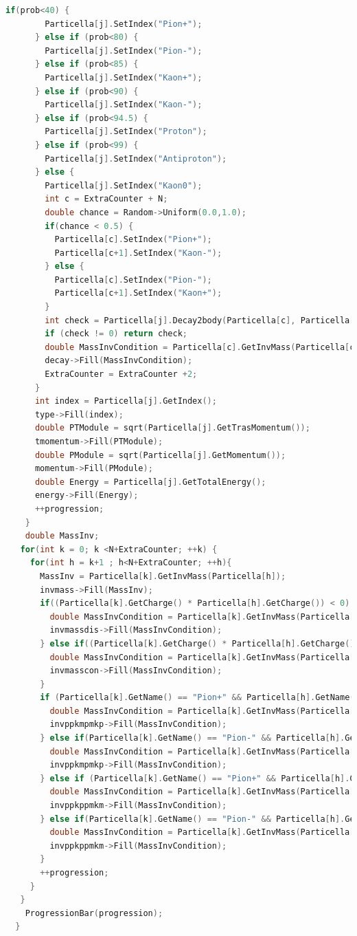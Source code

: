 \documentclass[a4paper, 11pt]{article}
\begin{document}
\begin{lstlisting}[language=c++, style=code]
      if(prob<40) {
        Particella[j].SetIndex("Pion+");
      } else if (prob<80) {
        Particella[j].SetIndex("Pion-");
      } else if (prob<85) {
        Particella[j].SetIndex("Kaon+");
      } else if (prob<90) {
        Particella[j].SetIndex("Kaon-");
      } else if (prob<94.5) {
        Particella[j].SetIndex("Proton");
      } else if (prob<99) {
        Particella[j].SetIndex("Antiproton");
      } else {
        Particella[j].SetIndex("Kaon0");
        int c = ExtraCounter + N;
        double chance = Random->Uniform(0.0,1.0);
        if(chance < 0.5) {
          Particella[c].SetIndex("Pion+");
          Particella[c+1].SetIndex("Kaon-");
        } else {
          Particella[c].SetIndex("Pion-");
          Particella[c+1].SetIndex("Kaon+");
        }
        int check = Particella[j].Decay2body(Particella[c], Particella[c+1]);
        if (check != 0) return check;
        double MassInvCondition = Particella[c].GetInvMass(Particella[c+1]);
        decay->Fill(MassInvCondition);
        ExtraCounter = ExtraCounter +2;
      }
      int index = Particella[j].GetIndex();
      type->Fill(index);
      double PTModule = sqrt(Particella[j].GetTrasMomentum());
      tmomentum->Fill(PTModule);
      double PModule = sqrt(Particella[j].GetMomentum());
      momentum->Fill(PModule);
      double Energy = Particella[j].GetTotalEnergy();
      energy->Fill(Energy);
      ++progression;
    }
    double MassInv;
   for(int k = 0; k <N+ExtraCounter; ++k) {
     for(int h = k+1 ; h<N+ExtraCounter; ++h){
       MassInv = Particella[k].GetInvMass(Particella[h]);
       invmass->Fill(MassInv);
       if((Particella[k].GetCharge() * Particella[h].GetCharge()) < 0) {
         double MassInvCondition = Particella[k].GetInvMass(Particella[h]);
         invmassdis->Fill(MassInvCondition);
       } else if((Particella[k].GetCharge() * Particella[h].GetCharge()) > 0) {
         double MassInvCondition = Particella[k].GetInvMass(Particella[h]);
         invmasscon->Fill(MassInvCondition);
       }
       if (Particella[k].GetName() == "Pion+" && Particella[h].GetName() == "Kaon-") {
         double MassInvCondition = Particella[k].GetInvMass(Particella[h]);
         invppkmpmkp->Fill(MassInvCondition);
       } else if(Particella[k].GetName() == "Pion-" && Particella[h].GetName() == "Kaon+") {
         double MassInvCondition = Particella[k].GetInvMass(Particella[h]);
         invppkmpmkp->Fill(MassInvCondition);
       } else if (Particella[k].GetName() == "Pion+" && Particella[h].GetName() == "Kaon+") {
         double MassInvCondition = Particella[k].GetInvMass(Particella[h]);
         invppkppmkm->Fill(MassInvCondition);
       } else if(Particella[k].GetName() == "Pion-" && Particella[h].GetName() == "Kaon-") {
         double MassInvCondition = Particella[k].GetInvMass(Particella[h]);
         invppkppmkm->Fill(MassInvCondition);
       }
       ++progression;
     }
   }
    ProgressionBar(progression);
  }


\end{lstlisting}
\end{document}
